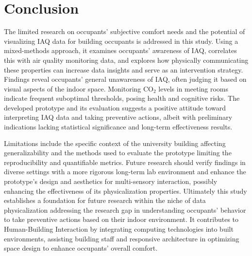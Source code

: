 \section{Conclusion}
\label{sec:conclusion}

The limited research on occupants' subjective comfort needs and the potential of visualizing IAQ data for building occupants is addressed in this study. Using a mixed-methods approach, it examines occupants' awareness of IAQ, correlates this with air quality monitoring data, and explores how physically communicating these properties can increase data insights and serve as an intervention strategy. Findings reveal occupants' general unawareness of IAQ, often judging it based on visual aspects of the indoor space. Monitoring CO$_{2}$ levels in meeting rooms indicate frequent suboptimal thresholds, posing health and cognitive risks. The developed prototype and its evaluation suggests a positive attitude toward interpreting IAQ data and taking preventive actions, albeit with preliminary indications lacking statistical significance and long-term effectiveness results. 

Limitations include the specific context of the university building affecting generalizability and the methods used to evaluate the prototype limiting the reproducibility and quantifiable metrics. Future research should verify findings in diverse settings with a more rigorous long-term lab environment and enhance the prototype's design and aesthetics for multi-sensory interaction, possibly enhancing the effectiveness of its physicalization properties. Ultimately this study establishes a foundation for future research within the niche of data physicalization addressing the research gap in understanding occupants' behavior to take preventive actions based on their indoor environment.  It contributes to Human-Building Interaction by integrating computing technologies into built environments, assisting building staff and responsive architecture in optimizing space design to enhance occupants' overall comfort.

\newpage